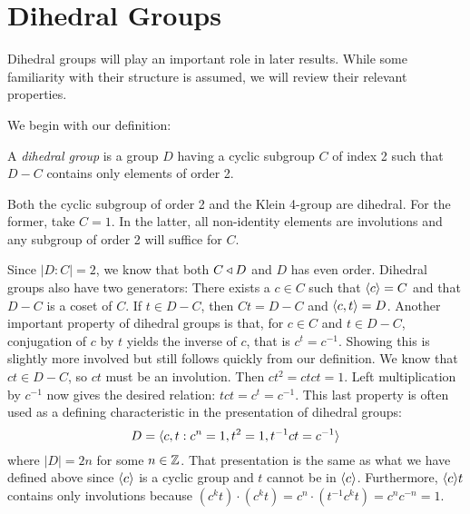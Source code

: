 \documentclass[main.tex]{subfiles}
\begin{document}
\section{Dihedral Groups}

Dihedral groups will play an important role in later results. While some familiarity with their structure is assumed, we will review their relevant properties.

\hss

We begin with our definition:

\begin{definition}
A \emph{dihedral group} is a group $D$ having a cyclic subgroup $C$ of index 2 such that $D - C$ contains only elements of order 2.
\end{definition}

\begin{remark}
Both the cyclic subgroup of order 2 and the Klein 4-group are dihedral. For the former, take $C = 1$. In the latter, all non-identity elements are involutions and any subgroup of order 2 will suffice for $C$.
\end{remark}

\hss

Since $|D : C| = 2$, we know that both $C \triangleleft D$ and $D$ has even order. Dihedral groups also have two generators: There exists a $c \in C$ such that $\langle c \rangle = C$ and that $D - C$ is a coset of $C$. If $t \in D - C$, then $Ct = D - C$ and $\langle c,t \rangle = D$. Another important property of dihedral groups is that, for $c \in C$ and $t \in D - C$, conjugation of $c$ by $t$ yields the inverse of $c$, that is $c^t = c^{-1}$. Showing this is slightly more involved but still follows quickly from our definition. We know that $ct \in D - C$, so $ct$ must be an involution. Then $ct^2 = ctct = 1$. Left multiplication by $c^{-1}$ now gives the desired relation: $tct = c^t = c^{-1}$. This last property is often used as a defining characteristic in the presentation of dihedral groups: 
$$D = \langle c, t : c^n = 1, t^2 = 1, t^{-1}ct = c^{-1} \rangle$$
where $|D| = 2n$ for some $n \in \mathbb{Z}$. That presentation is the same as what we have defined above since $\langle c \rangle$ is a cyclic group and $t$ cannot be in $\langle c \rangle$. Furthermore, $\langle c \rangle t$ contains only involutions because $(c^k t) \cdot (c^k t) = c^n \cdot (t^{-1} c^k t) = c^n c^{-n} = 1$.
\end{document}
